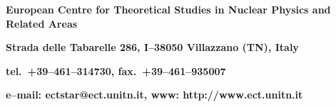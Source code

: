     \HRule
    \begin{center}
        \Large {\bf European Centre for Theoretical Studies in Nuclear
        Physics and Related Areas}
    \end{center}
    \begin{center}
        {\bf Strada delle Tabarelle 286, I--38050 Villazzano (TN),
        Italy}
    \end{center}
    \begin{center}
        {\bf tel.\ +39--461--314730, fax.\ +39--461--935007}
    \end{center}
     \begin{center}
        {\bf e--mail: ectstar@ect.unitn.it, www: http://www.ect.unitn.it}
    \end{center}
    \HRule






